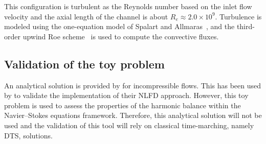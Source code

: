 This configuration is turbulent as the Reynolds number based on the
inlet flow velocity and the axial length of the channel is about $R_e
\approx 2.0 \times 10^9$.  Turbulence is modeled using the
one-equation model of Spalart and Allmaras~\cite{Spalart1992}, and the
third-order upwind Roe scheme~\cite{Roe1981} is used to compute the
convective fluxes.

\subsection{Validation of the toy problem}
An analytical solution is provided by \citet{Merkle1987} for
incompressible flows. This has been used by \citet{McMullen2001}
to validate the implementation of their NLFD approach.
However, this toy problem is used
to assess the properties of the harmonic balance within
the Navier--Stokes equations framework. Therefore,
this analytical solution will not be used and the validation of
this tool will rely on classical time-marching, namely DTS, solutions.
